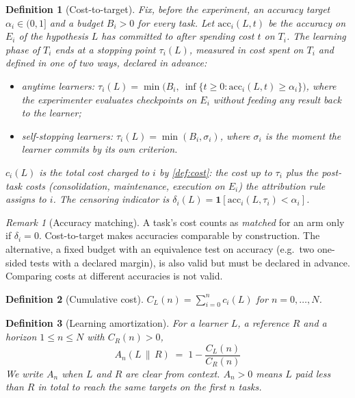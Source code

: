 \documentclass[11pt]{article}
\newtheorem{definition}{Definition}
\theoremstyle{remark}
\newtheorem{remark}{Remark}
\newcommand{\ind}{\mathbf{1}}
\begin{document}
\begin{definition}[Cost-to-target]\label{def:ctt}
Fix, before the experiment, an accuracy target $\alpha_i\in(0,1]$ and a budget $B_i>0$ for every task.
Let $\mathrm{acc}_i(L,t)$ be the accuracy on $E_i$ of the hypothesis $L$ has committed to after spending cost $t$ on $T_i$.
The learning phase of $T_i$ ends at a stopping point $\tau_i(L)$, measured in cost spent on $T_i$ and defined in one of two ways, declared in advance:
\begin{itemize}[itemsep=1pt]
\item \emph{anytime learners}: $\tau_i(L) = \min\bigl(B_i,\ \inf\{t\ge 0: \mathrm{acc}_i(L,t)\ge \alpha_i\}\bigr)$, where the experimenter evaluates checkpoints on $E_i$ without feeding any result back to the learner;
\item \emph{self-stopping learners}: $\tau_i(L)=\min(B_i,\sigma_i)$, where $\sigma_i$ is the moment the learner commits by its own criterion.
\end{itemize}
$c_i(L)$ is the total cost charged to $i$ by \cref{def:cost}: the cost up to $\tau_i$ plus the post-task costs (consolidation, maintenance, execution on $E_i$) the attribution rule assigns to $i$.
The censoring indicator is $\delta_i(L)=\ind[\mathrm{acc}_i(L,\tau_i)<\alpha_i]$.
\end{definition}

\begin{remark}[Accuracy matching]
A task's cost counts as \emph{matched} for an arm only if $\delta_i=0$.
Cost-to-target makes accuracies comparable by construction.
The alternative, a fixed budget with an equivalence test on accuracy (e.g.\ two one-sided tests with a declared margin), is also valid but must be declared in advance.
Comparing costs at different accuracies is not valid.
\end{remark}

\begin{definition}[Cumulative cost]\label{def:cum}
$C_L(n) = \sum_{i=0}^{n} c_i(L)$ for $n=0,\dots,N$.
\end{definition}

\begin{definition}[Learning amortization]\label{def:A}
For a learner $L$, a reference $R$ and a horizon $1\le n\le N$ with $C_R(n)>0$,
\begin{equation}\label{eq:A}
\boxed{\;A_n(L\,\|\,R) \;=\; 1-\frac{C_L(n)}{C_R(n)}\;}
\end{equation}
We write $A_n$ when $L$ and $R$ are clear from context.
$A_n>0$ means $L$ paid less than $R$ in total to reach the same targets on the first $n$ tasks.
\end{definition}
\end{document}
